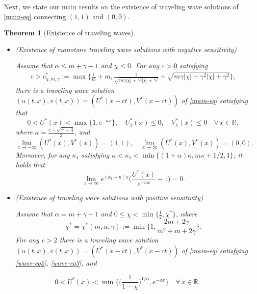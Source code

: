 \documentclass[11pt]{article} %
\newtheorem{theorem}{Theorem}[section] %
\theoremstyle{remark}
\theoremstyle{remark}
\numberwithin{equation}{section}
\numberwithin{figure}{section}
\numberwithin{table}{section}
\newcommand\RR{\ensuremath{\mathbb{R}}}
\begin{document}
Next, we state our main results on the existence of traveling  wave solutions of \eqref{main-eq}
connecting $(1,1)$ and $(0,0)$. 

\begin{theorem}[Existence of  traveling waves]
\label{monotone-thm}
$\quad$

\begin{itemize}
\item[(1)] {\rm (Existence of monotone traveling  wave solutions with negative sensitivity)}

 Assume that  $\alpha\le m+\gamma -1$ and $\chi\le 0$. For any   $c>0$ satisfying
\begin{align}
\label{cond-on-c-eq1}
c>c^*_{\chi,m,\gamma}:=\max\Big\{ \frac{1}{m}+m, \frac{1}{\sqrt{m\gamma |\chi|+\gamma^2 |\chi|+\gamma^2}} + \sqrt {m\gamma |\chi| +\gamma^2 |\chi|+\gamma^2}\Big\},
\end{align}
 there is a traveling wave solution
$(u(t,x),v(t,x))=(U^*(x-ct),V^*(x-ct))$ of \eqref{main-eq}  satisfying that
\begin{equation}
\label{wave-eq1}
0<U^*(x)<\max\{1, e^{-\kappa x}\},\quad 
U^*_x(x)\le 0,\quad V^*_x(x)\le 0\quad \forall\, x\in\RR,
\end{equation}
where $\kappa =\frac{c-\sqrt{c^2-4}}{2}$,
and
\begin{equation}
\label{wave-eq2}
\lim_{x\to -\infty}(U^*(x),V^*(x))=(1,1),\quad \lim_{x\to\infty} (U^*(x), V^*(x))=(0,0).
\end{equation}
Moreover, for any $\kappa_1$ satisfying $\kappa<\kappa_1<  \min\{(1+\alpha)\kappa,  m\kappa +1/2,  1\}$, 
 it holds that
\begin{equation}
\label{wave-eq3}
\lim_{x\to\infty} e^{(\kappa_1-\kappa)x} \Big(\frac{U^*(x)}{e^{-\kappa x}}-1\Big)=0.
\end{equation}



\item[(2)] {\rm (Existence of traveling wave solutions with positive sensitivity)}

Assume  that  $\alpha=  m+\gamma -1$ and $0\le \chi<\min\{\frac{1}{2},\chi^*\}$, where
\begin{equation}
\label{chi-star-eq}
\chi^*=\chi^*(m,\alpha,\gamma):=\min\Big\{1, \frac{2m+2\gamma}{m^2+m+2\gamma}\Big\}.
\end{equation}
 For any  $c>2$  there is a traveling wave solution 
$(u(t,x),v(t,x))=(U^*(x-ct),V^*(x-ct))$ of \eqref{main-eq} satisfying 
 \eqref{wave-eq2},  \eqref{wave-eq3}, and
\end{itemize}
\begin{equation}
\label{wave-eq4}
0<U^*(x)<\min\Big\{\big(\frac{1}{1-\chi}\big)^{1/\alpha}, e^{-\kappa x}\Big\}\quad \forall\, x\in\RR.
\end{equation}
\end{theorem}
\end{document}
